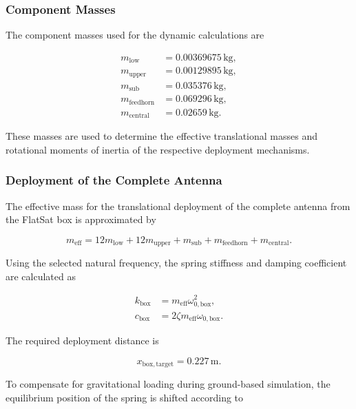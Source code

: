 	
	
	\subsubsection{Component Masses}
	
	The component masses used for the dynamic calculations are
	
	\begin{align}
		m_{\mathrm{low}} &= 0.00369675\,\mathrm{kg},\\
		m_{\mathrm{upper}} &= 0.00129895\,\mathrm{kg},\\
		m_{\mathrm{sub}} &= 0.035376\,\mathrm{kg},\\
		m_{\mathrm{feedhorn}} &= 0.069296\,\mathrm{kg},\\
		m_{\mathrm{central}} &= 0.02659\,\mathrm{kg}.
	\end{align}
	
	These masses are used to determine the effective translational masses and rotational moments of inertia of the respective deployment mechanisms.
	
	\subsubsection{Deployment of the Complete Antenna}
	
	The effective mass for the translational deployment of the complete antenna from the FlatSat box is approximated by
	
	\begin{equation}
		m_{\mathrm{eff}}
		=
		12m_{\mathrm{low}}
		+12m_{\mathrm{upper}}
		+m_{\mathrm{sub}}
		+m_{\mathrm{feedhorn}}
		+m_{\mathrm{central}}.
	\end{equation}
	
	Using the selected natural frequency, the spring stiffness and damping coefficient are calculated as
	
	\begin{align}
		k_{\mathrm{box}}
		&=m_{\mathrm{eff}}\omega_{0,\mathrm{box}}^2,\\
		c_{\mathrm{box}}
		&=2\zeta m_{\mathrm{eff}}\omega_{0,\mathrm{box}}.
	\end{align}
	
	The required deployment distance is
	
	\begin{equation}
		x_{\mathrm{box,target}}=0.227\,\mathrm{m}.
	\end{equation}
	
	To compensate for gravitational loading during ground-based simulation, the equilibrium position of the spring is shifted according to
	

